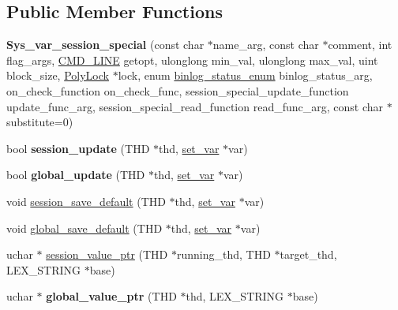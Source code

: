 \subsection*{Public Member Functions}
\begin{DoxyCompactItemize}
\item 
\mbox{\label{classSys__var__session__special_a68834ad9680993377bf594b4957be963}} 
{\bfseries Sys\+\_\+var\+\_\+session\+\_\+special} (const char $\ast$name\+\_\+arg, const char $\ast$comment, int flag\+\_\+args, \mbox{\hyperlink{structCMD__LINE}{C\+M\+D\+\_\+\+L\+I\+NE}} getopt, ulonglong min\+\_\+val, ulonglong max\+\_\+val, uint block\+\_\+size, \mbox{\hyperlink{classPolyLock}{Poly\+Lock}} $\ast$lock, enum \mbox{\hyperlink{classsys__var_a664520ec82191888717c86085bfa83ce}{binlog\+\_\+status\+\_\+enum}} binlog\+\_\+status\+\_\+arg, on\+\_\+check\+\_\+function on\+\_\+check\+\_\+func, session\+\_\+special\+\_\+update\+\_\+function update\+\_\+func\+\_\+arg, session\+\_\+special\+\_\+read\+\_\+function read\+\_\+func\+\_\+arg, const char $\ast$substitute=0)
\item 
\mbox{\label{classSys__var__session__special_a4e2f65e9e9bce8b0b956d2a60a6d389b}} 
bool {\bfseries session\+\_\+update} (T\+HD $\ast$thd, \mbox{\hyperlink{classset__var}{set\+\_\+var}} $\ast$var)
\item 
\mbox{\label{classSys__var__session__special_a8528584cb0ac83b34e71c28cf979c9e0}} 
bool {\bfseries global\+\_\+update} (T\+HD $\ast$thd, \mbox{\hyperlink{classset__var}{set\+\_\+var}} $\ast$var)
\item 
void \mbox{\hyperlink{classSys__var__session__special_a1a685de0cd05c6161889034e899178b2}{session\+\_\+save\+\_\+default}} (T\+HD $\ast$thd, \mbox{\hyperlink{classset__var}{set\+\_\+var}} $\ast$var)
\item 
void \mbox{\hyperlink{classSys__var__session__special_aae482b58f68b85585c41527fcb71c7d9}{global\+\_\+save\+\_\+default}} (T\+HD $\ast$thd, \mbox{\hyperlink{classset__var}{set\+\_\+var}} $\ast$var)
\item 
uchar $\ast$ \mbox{\hyperlink{classSys__var__session__special_afd6109e270df2c53c15536de4929ece3}{session\+\_\+value\+\_\+ptr}} (T\+HD $\ast$running\+\_\+thd, T\+HD $\ast$target\+\_\+thd, L\+E\+X\+\_\+\+S\+T\+R\+I\+NG $\ast$base)
\item 
\mbox{\label{classSys__var__session__special_a6ac1609e8f3d12bfe7dc3130bc0b8ea9}} 
uchar $\ast$ {\bfseries global\+\_\+value\+\_\+ptr} (T\+HD $\ast$thd, L\+E\+X\+\_\+\+S\+T\+R\+I\+NG $\ast$base)
\end{DoxyCompactItemize}
